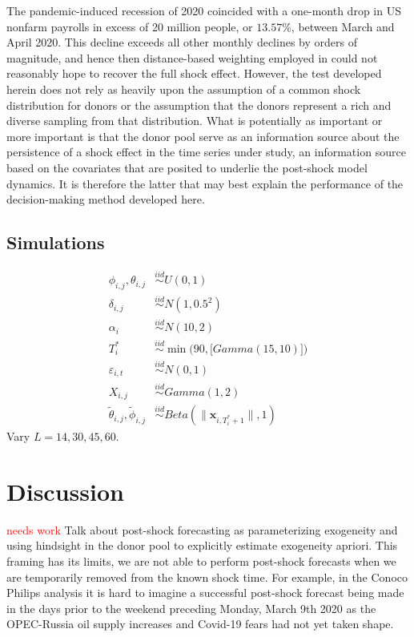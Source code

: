 \documentclass[11pt]{article}
\def\mbf#1{\mathbf{#1}} %
\newcommand{\simiid}{\stackrel{iid}{\sim}} %
\theoremstyle{definition}
\begin{document}
The pandemic-induced recession of 2020 coincided with a one-month drop in US nonfarm payrolls in excess of 20 million people, or $13.57\%$, between March and April 2020.  This decline exceeds all other monthly declines by orders of magnitude, and hence then distance-based weighting employed in \citep{lin2021minimizing} could not reasonably hope to recover the full shock effect.  However, the test developed herein does not rely as heavily upon the assumption of a common shock distribution for donors or the assumption that the donors represent a rich and diverse sampling from that distribution.  What is potentially as important or more important is that the donor pool serve as an information source about the persistence of a shock effect in the time series under study, an information source based on the covariates that are posited to underlie the post-shock model dynamics.  It is therefore the latter that may best explain the performance of the decision-making method developed here.


\subsection{Simulations}
\label{simulation}


\begin{align*}
	\phi_{i,j}, \theta_{i,j}  & \simiid U(0,1) \\ 
	\delta_{i,j} & \simiid N(1,0.5^2) \\
	\alpha_i & \simiid N(10, 2) \\
	T_i^* & \simiid \min\Big(90, \big[Gamma(15,10)\big]\Big) \\
	\varepsilon_{i,t} & \simiid N(0,1)\\
	X_{i,j} & \simiid Gamma(1,2) \\
	\tilde{\theta}_{i,j},\tilde{\phi}_{i,j} & \simiid Beta(\|\mbf{x}_{i,T_i^*+1}\|,1)
\end{align*}
Vary $L = 14, 30, 45,60$.



\section{Discussion}

\textcolor{red}{needs work} Talk about post-shock forecasting as parameterizing exogeneity and using hindsight in the donor pool to explicitly estimate exogeneity apriori. This framing has its limits, we are not able to perform post-shock forecasts when we are temporarily removed from the known shock time. For example, in the Conoco Philips analysis it is hard to imagine a successful post-shock forecast being made in the days prior to the weekend preceding Monday, March 9th 2020 as the OPEC-Russia oil supply increases and Covid-19 fears had not yet taken shape.
\end{document}
